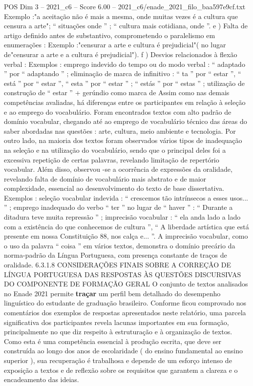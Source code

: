 \begin{textsample}{POS Dim 3 – 2021\_c6 – Score 6.00 – 2021\_c6/enade\_2021\_filo\_baa597e9cf.txt}
Exemplo :"a aceitação não é mais a mesma, onde muitas vezes é a cultura que censura a arte"; “ situações onde ” ; “ cultura mais cotidiana, onde ”. e ) Falta de artigo definido antes de substantivo, comprometendo o paralelismo em enumerações : Exemplo :"censurar a arte e cultura é prejudicial"( no lugar de"censurar a arte e a cultura é prejudicial"). f ) Desvios relacionados à flexão verbal : Exemplos : emprego indevido do tempo ou do modo verbal : “ adaptado ” por “ adaptando ” ; eliminação de marca de infinitivo : “ ta ” por “ estar ”, “ está ” por “ estar ”, “ esta ” por “ estar ” ; “ estás ” por “ estas ” ; utilização de construção de “ estar ” + gerúndio como marca de Assim como nas demais competências avaliadas, há diferenças entre os participantes em relação à seleção e ao emprego do vocabulário.
Foram encontrados textos com alto padrão de domínio vocabular, chegando até ao emprego de vocabulário técnico das áreas do saber abordadas nas questões : arte, cultura, meio ambiente e tecnologia.
Por outro lado, na maioria dos textos foram observados vários tipos de inadequação na seleção e na utilização do vocabulário, sendo que o principal deles foi a excessiva repetição de certas palavras, revelando limitação de repertório vocabular.
Além disso, observou -se a ocorrência de expressões da oralidade, revelando falta de domínio de vocabulário mais abstrato e de maior complexidade, essencial ao desenvolvimento do texto de base dissertativa.
Exemplos : seleção vocabular indevida : “ crescemos tão intrínsecos a esses usos... ” ; emprego inadequado do verbo “ ter ” no lugar de “ haver ” : “ Durante a ditadura teve muita repressão ” ; imprecisão vocabular : “ ela anda lado a lado com a existência do que conhecemos de cultura ”, “ A liberdade artística que está presente em nossa Constituição 88, nos calça e... ”.
A imprecisão vocabular, como o uso da palavra “ coisa ” em vários textos, demonstra o domínio precário da norma-padrão da Língua Portuguesa, com presença constante de traços de oralidade. 6.3.1.8 CONSIDERAÇÕES FINAIS SOBRE A CORREÇÃO DE LÍNGUA PORTUGUESA DAS RESPOSTAS ÀS QUESTÕES DISCURSIVAS DO COMPONENTE DE FORMAÇÃO GERAL O conjunto de textos analisados no Enade 2021 permite \textbf{traçar} um perfil bem detalhado do desempenho linguístico do estudante de graduação brasileiro.
Conforme ficou comprovado nos comentários dos exemplos de respostas apresentados neste relatório, uma parcela significativa dos participantes revela lacunas importantes em sua formação, principalmente no que diz respeito à estruturação e à organização de textos.
Como esta é uma competência essencial à produção escrita, que deve ser construída ao longo dos anos de escolaridade ( do ensino fundamental ao ensino superior ), sua recuperação é trabalhosa e depende de um esforço intenso de exposição a textos e de reflexão sobre os requisitos que garantem a clareza e o encadeamento das ideias.

\end{textsample}
